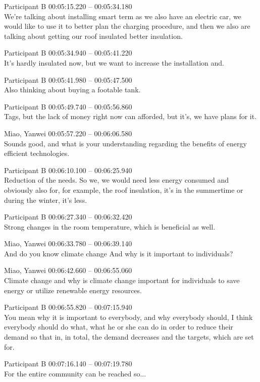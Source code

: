 {Participant B 00:05:15.220 -- 00:05:34.180 \\
We're talking about installing smart term as we also have an electric car, we would like to use it to better plan the charging procedure, and then we also are talking about getting our roof insulated better insulation.

Participant B 00:05:34.940 -- 00:05:41.220 \\
It's hardly insulated now, but we want to increase the installation and.

Participant B 00:05:41.980 -- 00:05:47.500 \\
Also thinking about buying a footable tank.

Participant B 00:05:49.740 -- 00:05:56.860 \\
Tags, but the lack of money right now can afforded, but it's, we have plans for it.

Miao, Yanwei 00:05:57.220 -- 00:06:06.580 \\
Sounds good, and what is your understanding regarding the benefits of energy efficient technologies.

Participant B 00:06:10.100 -- 00:06:25.940 \\
Reduction of the needs. So we, we would need less energy consumed and obviously also for, for example, the roof insulation, it's in the summertime or during the winter, it's less.

Participant B 00:06:27.340 -- 00:06:32.420 \\
Strong changes in the room temperature, which is beneficial as well.

Miao, Yanwei 00:06:33.780 -- 00:06:39.140 \\
And do you know climate change And why is it important to individuals?

Miao, Yanwei 00:06:42.660 -- 00:06:55.060 \\
Climate change and why is climate change important for individuals to save energy or utilize renewable energy resources.

Participant B 00:06:55.820 -- 00:07:15.940 \\
You mean why it is important to everybody, and why everybody should, I think everybody should do what, what he or she can do in order to reduce their demand so that in, in total, the demand decreases and the targets, which are set for.

Participant B 00:07:16.140 -- 00:07:19.780 \\
For the entire community can be reached so...

}
